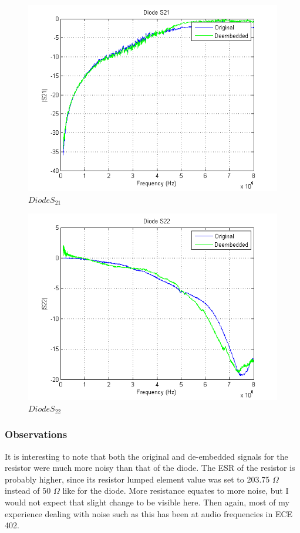 \documentclass{article} %
\begin{document}
	\begin{figure}[!H]
		\centering
		\label{fig:DS21}
		\caption{$Diode S_{21}$}
		\includegraphics{DiodeS21}
	\end{figure}
	
	\begin{figure}[!H]
		\centering
		\label{fig:DS22}
		\caption{$Diode S_{22}$}
		\includegraphics{DiodeS22}
	\end{figure}
	
	\vfill %
	\clearpage %
	
	\subsubsection{Observations}
	It is interesting to note that both the original and de-embedded signals for the resistor were much more noisy than that of the diode.  The ESR of the resistor is probably higher, since its resistor lumped element value was set to 203.75 $\Omega$ instead of 50 $\Omega$ like for the diode.  More resistance equates to more noise, but I would not expect that slight change to be visible here.  Then again, most of my experience dealing with noise such as this has been at audio frequencies in ECE 402.
	
\end{document}
